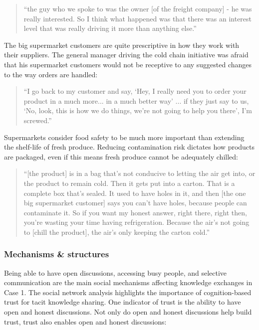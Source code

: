 \begin{quote}
\small
\enquote{the guy who we spoke to was the owner [of the freight company] - he was really interested. So I think what happened was that there was an interest level that was really driving it more than anything else.} \\
\end{quote}

The big supermarket customers are quite prescriptive in how they work with their suppliers. The general manager driving the cold chain initiative was afraid that his supermarket customers would not be receptive to any suggested changes to the way orders are handled:

\begin{quote}
\small
\enquote{I go back to my customer and say, \enquote{Hey, I really need you to order your product in a much more... in a much better way} ... if they just say to us, \enquote{No, look, this is how we do things, we’re not going to help you there}, I’m screwed.} \\
\end{quote}

Supermarkets consider food safety to be much more important than extending the shelf-life of fresh produce. Reducing contamination risk dictates how products are packaged, even if this means fresh produce cannot be adequately chilled:

\begin{quote}
\small
\enquote{[the product] is in a bag that's not conducive to letting the air get into, or the product to remain cold. Then it gets put into a carton. That is a complete box that’s sealed. It used to have holes in it, and then [the one big supermarket customer] says you can't have holes, because people can contaminate it. So if you want my honest answer, right there, right then, you're wasting your time having refrigeration. Because the air's not going to [chill the product], the air's only keeping the carton cold.} \\
\end{quote}

\subsubsection{Mechanisms & structures}

Being able to have open discussions, accessing busy people, and selective communication are the main social mechanisms affecting knowledge exchanges in Case 1. The social network analysis highlights the importance of cognition-based trust for tacit knowledge sharing. One indicator of trust is the ability to have open and honest discussions. Not only do open and honest discussions help build trust, trust also enables open and honest discussions:

